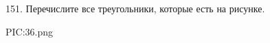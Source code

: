 151. Перечислите все треугольники, которые есть на рисунке.
\begin{center}
{{PIC:36.png}}
\end{center}
